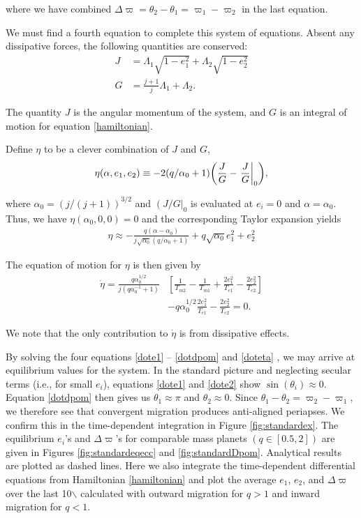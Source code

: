 \documentclass{mnras}
\DeclarePairedDelimiter{\p}{(}{)}
\begin{document}
where we have combined \(\Delta\varpi = \theta_2 - \theta_1 =
\varpi_1-\varpi_2\) in the last equation.

We must find a fourth equation to complete this system of equations.
Absent any dissipative forces, the following quantities are conserved:
\begin{align}
  J &= \Lambda_1\sqrt{1-e_1^2} + \Lambda_2\sqrt{1-e_2^2}\\
  G &= \frac{j+1}{j} \Lambda_1 + \Lambda_2.
\end{align}

The quantity \(J\) is the angular momentum of the system, and \(G\) is
an integral of motion for equation \eqref{hamiltonian}.

Define \(\eta\) to be a clever combination of \(J\) and \(G\),
\begin{align}
  \eta(\alpha, e_1, e_2) &\equiv - 2(q/\alpha_0+1)\p*{\frac{J}{G}-\left.\frac{J}{G}\right|_{0}}, \\
\end{align}

where \(\alpha_0 = (j/(j+1))^{3/2}\) and \(\left(J/G\right|_{0}\) is
evaluated at \(e_i=0\) and \(\alpha=\alpha_0\).
Thus, we have \(\eta(\alpha_0, 0, 0)=0\) and the corresponding Taylor expansion yields
\begin{align}
  \eta \approx -\frac{q(\alpha-\alpha_0)}{j\sqrt{\alpha_0}(q/\alpha_0+1)} + q\sqrt{\alpha_0}e_1^2 + e_2^2
\end{align}

The equation of motion for \(\eta\) is then given by
\begin{align}
\label{doteta}
  \dot\eta = \frac{q\alpha_0^{1/2}}{j(q\alpha_0^{-1}+1)}&\left[ \frac{1}{T_{m2}} - \frac{1}{T_{m1}}
      + \frac{2e_1^2}{T_{e1}}- \frac{2e_2^2}{T_{e2}} \right] \nonumber\\
    &- q\alpha_0^{1/2}\frac{2e_1^2}{T_{e1}} - \frac{2e_2^2}{T_{e2}}=0.
\end{align}

We note that the only contribution to \(\dot{\eta}\) is from dissipative effects.

By solving the four equations \eqref{dote1} -- \eqref{dotdpom} and
\eqref{doteta} , we may arrive at equilibrium values for the system.  In
the standard picture and neglecting secular terms (i.e., for small
\(e_i\)), equations \eqref{dote1} and \eqref{dote2} show
\(\sin(\theta_i)\approx 0\).  Equation \eqref{dotdpom} then gives us
\(\theta_1\approx \pi\) and \(\theta_2\approx 0\).  Since
\(\theta_1-\theta_2 = \varpi_2-\varpi_1\), we therefore see that
convergent migration produces anti-aligned periapses.  We confirm this
in the time-dependent integration in Figure \ref{fig:standardex}.
The equilibrium \(e_i\)'s and \(\Delta\varpi\)'s for comparable mass
planets \((q\in[0.5,2])\) are given in Figures \ref{fig:standardeqecc} and
\ref{fig:standardDpom}.  Analytical results are plotted as dashed lines.
Here we also integrate the time-dependent differential equations from
Hamiltonian \eqref{hamiltonian} and plot the average \(e_1\), \(e_2\), and
\(\Delta\varpi\) over the last 10$\backslash$%
calculated with outward migration for \(q>1\) and inward migration for
\(q<1\).
\end{document}
